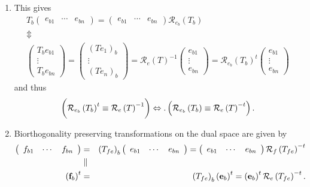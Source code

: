 \documentclass[aps,preprint]{revtex4}
\begin{document}
\begin{enumerate}
\item This gives 
\begin{gather}
T_{b}\left( 
\begin{array}{ccc}
e_{b1} & \cdots & e_{bn}%
\end{array}%
\right) =\left( 
\begin{array}{ccc}
e_{b1} & \cdots & e_{bn}%
\end{array}%
\right) \mathcal{R}_{e_{b}}\left( T_{b}\right) \\
\Updownarrow \\
\left( 
\begin{array}{c}
T_{b}e_{b1} \\ 
\vdots \\ 
T_{b}e_{bn}%
\end{array}%
\right) =\left( 
\begin{array}{c}
\left( Te_{1}\right) _{b} \\ 
\vdots \\ 
\left( Te_{n}\right) _{b}%
\end{array}%
\right) =\mathcal{R}_{e}\left( T\right) ^{-1}\left( 
\begin{array}{c}
e_{b1} \\ 
\vdots \\ 
e_{bn}%
\end{array}%
\right) =\mathcal{R}_{e_{b}}\left( T_{b}\right) ^{t}\left( 
\begin{array}{c}
e_{b1} \\ 
\vdots \\ 
e_{bn}%
\end{array}%
\right)
\end{gather}%
and thus 
\begin{equation}
\left( \overset{}{\mathcal{R}_{e_{b}}\left( T_{b}\right) ^{t}\equiv \mathcal{%
R}_{e}\left( T\right) ^{-1}}\right) \Leftrightarrow .\left( \overset{}{%
\mathcal{R}_{e_{b}}\left( T_{b}\right) \equiv \mathcal{R}_{e}\left( T\right)
^{-t}}\right) .
\end{equation}

\item Biorthogonality preserving transformations on the dual space are given
by 
\begin{eqnarray}
\left( 
\begin{array}{ccc}
f_{b1} & \cdots & f_{bn}%
\end{array}%
\right) &=&\left( T_{fe}\right) _{b}\left( 
\begin{array}{ccc}
e_{b1} & \cdots & e_{bn}%
\end{array}%
\right) =\left( 
\begin{array}{ccc}
e_{b1} & \cdots & e_{bn}%
\end{array}%
\right) \mathcal{R}_{f}\left( T_{fe}\right) ^{-t} \\
&\parallel & \\
\left( \mathbf{f}_{b}\right) ^{t} &=&\left( T_{fe}\right) _{b}\left( \mathbf{%
e}_{b}\right) ^{t}=\left( \mathbf{e}_{b}\right) ^{t}\mathcal{R}_{e}\left(
T_{fe}\right) ^{-t}.
\end{eqnarray}
\end{enumerate}
\end{document}
